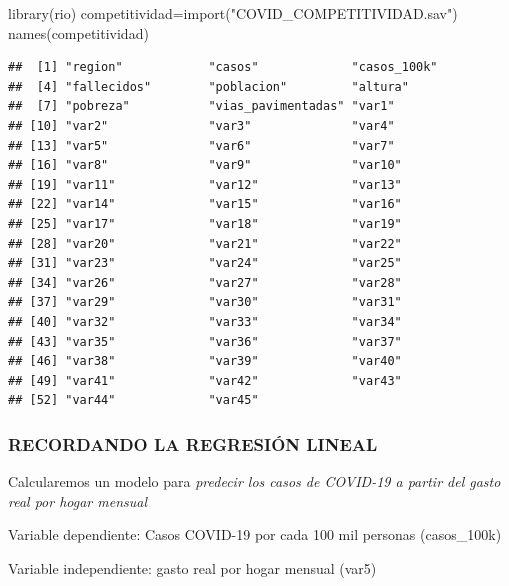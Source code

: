 \documentclass[
]{article}
\newenvironment{Shaded}{\begin{snugshade}}{\end{snugshade}}
\newcommand{\FunctionTok}[1]{\textcolor[rgb]{0.00,0.00,0.00}{#1}}
\newcommand{\NormalTok}[1]{#1}
\newcommand{\OtherTok}[1]{\textcolor[rgb]{0.56,0.35,0.01}{#1}}
\newcommand{\SpecialCharTok}[1]{\textcolor[rgb]{0.00,0.00,0.00}{#1}}
\newcommand{\StringTok}[1]{\textcolor[rgb]{0.31,0.60,0.02}{#1}}
\begin{document}
\begin{Shaded}
\begin{Highlighting}[]
\FunctionTok{library}\NormalTok{(rio)}
\NormalTok{competitividad}\OtherTok{=}\FunctionTok{import}\NormalTok{(}\StringTok{"COVID\_COMPETITIVIDAD.sav"}\NormalTok{)}
\FunctionTok{names}\NormalTok{(competitividad)}
\end{Highlighting}
\end{Shaded}

\begin{verbatim}
##  [1] "region"            "casos"             "casos_100k"       
##  [4] "fallecidos"        "poblacion"         "altura"           
##  [7] "pobreza"           "vias_pavimentadas" "var1"             
## [10] "var2"              "var3"              "var4"             
## [13] "var5"              "var6"              "var7"             
## [16] "var8"              "var9"              "var10"            
## [19] "var11"             "var12"             "var13"            
## [22] "var14"             "var15"             "var16"            
## [25] "var17"             "var18"             "var19"            
## [28] "var20"             "var21"             "var22"            
## [31] "var23"             "var24"             "var25"            
## [34] "var26"             "var27"             "var28"            
## [37] "var29"             "var30"             "var31"            
## [40] "var32"             "var33"             "var34"            
## [43] "var35"             "var36"             "var37"            
## [46] "var38"             "var39"             "var40"            
## [49] "var41"             "var42"             "var43"            
## [52] "var44"             "var45"
\end{verbatim}

\hypertarget{recordando-la-regresiuxf3n-lineal}{%
\subsubsection{RECORDANDO LA REGRESIÓN
LINEAL}\label{recordando-la-regresiuxf3n-lineal}}

Calcularemos un modelo para \emph{predecir los casos de COVID-19 a
partir del gasto real por hogar mensual}🥶

Variable dependiente: Casos COVID-19 por cada 100 mil personas
(casos\_100k)

Variable independiente: gasto real por hogar mensual (var5)

\begin{Shaded}
\end{Shaded}
\end{document}
